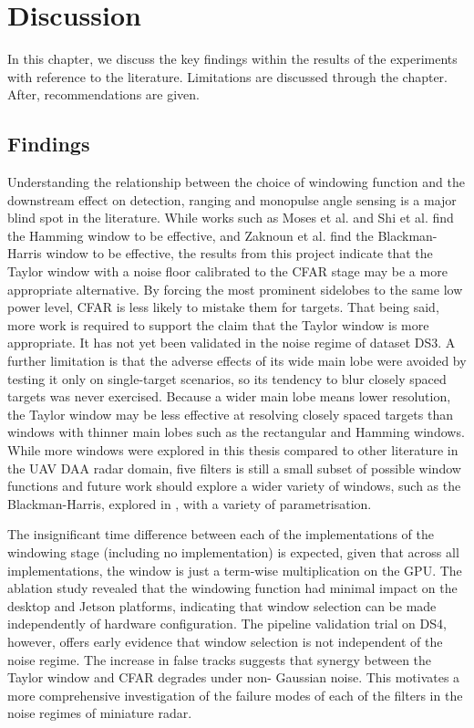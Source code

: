 \chapter{Discussion}
In this chapter, we discuss the key findings within the results of the 
experiments with reference to the literature. Limitations 
are discussed through the chapter. After, recommendations are 
given. 

\section{Findings}
Understanding the relationship between the choice of windowing 
function and the downstream effect on detection, ranging and 
monopulse angle sensing is a major blind spot in the literature. 
While works such as Moses et al. \cite{6044363} and Shi et al.
\cite{6712628} find the Hamming window to be effective, and
Zaknoun et al.
\cite{zaknoun2024_realtime_gpu_accelerated_radar_processing}
find the Blackman-Harris window to be effective, the results
from this project indicate that the Taylor window with a
noise floor calibrated to the CFAR stage may be a
more appropriate alternative. By forcing the most prominent
sidelobes to the same low power level, CFAR is less likely to 
mistake them for targets. That being said, more work is required 
to support the claim that the Taylor window is more appropriate. 
It has not yet been validated in the noise regime of dataset DS3.
A further limitation is that the adverse effects of its wide main 
lobe were avoided by testing it only on single-target scenarios, so its tendency to 
blur closely spaced targets was never exercised.
Because a wider main lobe means lower resolution, 
the Taylor window may be less effective at resolving closely spaced
targets than windows with thinner main lobes such as the rectangular 
and Hamming windows. While more windows were explored 
in this thesis compared to other literature in the UAV DAA radar domain, 
five filters is still a small subset of possible window functions 
and future work should explore a wider variety of windows, such as
the Blackman-Harris, explored in 
\cite{zaknoun2024_realtime_gpu_accelerated_radar_processing}, with 
a variety of parametrisation. 

The insignificant time difference between each of the implementations of the windowing 
stage (including no implementation) is expected, given that across all implementations, 
the window is just a term-wise multiplication on the GPU. The ablation study revealed 
that the windowing function had minimal impact on the desktop and Jetson platforms, 
indicating that window selection can be made independently of hardware configuration. 
The pipeline validation trial on DS4, however, offers early evidence that window 
selection is not independent of the noise regime. The increase in false tracks 
suggests that synergy between the Taylor window and CFAR degrades under non-
Gaussian noise. This motivates a more comprehensive investigation of the 
failure modes of each of the filters in the noise regimes of miniature radar.


